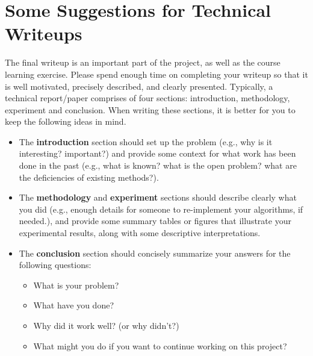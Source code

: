 \documentclass[10pt]{article}
\begin{document}
\appendix
\section{Some Suggestions for Technical Writeups}
The final writeup is an important part of the project, as well as the course learning exercise.
Please spend enough time on completing your writeup
so that it is well motivated, precisely described, and clearly presented.
Typically, a technical report/paper comprises of four sections: introduction, methodology, experiment and conclusion.
When writing these sections, it is better for you to keep the following ideas in mind.
\begin{itemize}
	\item The \textbf{introduction} section should set up the problem (e.g., why is it interesting? important?) and provide some
	      context for what work has been done in the past (e.g., what is known? what is the open problem? what are the deficiencies of
	      existing methods?).
	\item The \textbf{methodology} and \textbf{experiment} sections should describe clearly what you did (e.g., enough details for someone to
	      re-implement your algorithms, if needed.), and provide some summary tables or figures that illustrate your experimental results,
	      along with some descriptive interpretations.
	\item The \textbf{conclusion} section should concisely summarize your answers for the following questions:
	      \begin{itemize}
		      \item What is your problem?
		      \item What have you done?
		      \item Why did it work well? (or why didn't?)
		      \item What might you do if you want to continue working on this project?
	      \end{itemize}
\end{itemize}
\end{document}
